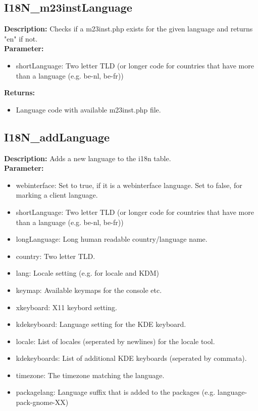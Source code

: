 \subsection{I18N\_m23instLanguage}
\textbf{Description:} Checks if a m23inst.php exists for the given language and returns "en" if not.\\
\textbf{Parameter:}
\begin{itemize}
\item shortLanguage: Two letter TLD (or longer code for countries that have more than a language (e.g. be-nl, be-fr))
\end{itemize}
\textbf{Returns:}
\begin{itemize}
\item Language code with available m23inst.php file.
\end{itemize}

\subsection{I18N\_addLanguage}
\textbf{Description:} Adds a new language to the i18n table.\\
\textbf{Parameter:}
\begin{itemize}
\item webinterface: Set to true, if it is a webinterface language. Set to false, for marking a client language.
\item shortLanguage: Two letter TLD (or longer code for countries that have more than a language (e.g. be-nl, be-fr))
\item longLanguage: Long human readable country/language name.
\item country: Two letter TLD.
\item lang: Locale setting (e.g. for locale and KDM)
\item keymap: Available keymaps for the console etc.
\item xkeyboard: X11 keybord setting.
\item kdekeyboard: Language setting for the KDE keyboard.
\item locale: List of locales (seperated by newlines) for the locale tool.
\item kdekeyboards: List of additional KDE keyboards (seperated by commata).
\item timezone: The timezone matching the language.
\item packagelang: Language suffix that is added to the packages (e.g. language-pack-gnome-XX)
\end{itemize}

